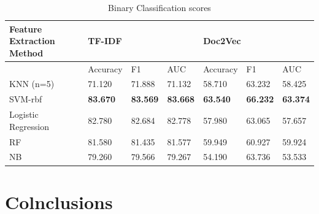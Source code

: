 \documentclass{article}
\begin{document}
\begin{table}[h]
  \begin{tabular}{lllllll}
  \hline
  Feature Extraction Method & \multicolumn{3}{l}{TF-IDF}                          & \multicolumn{3}{l}{Doc2Vec}                         \\ \hline
                            & Accuracy        & F1              & AUC             & Accuracy        & F1              & AUC             \\ \hline
  KNN (n=5)                 & 71.120          & 71.888          & 71.132          & 58.710          & 63.232          & 58.425          \\
  SVM-rbf                   & \textbf{83.670} & \textbf{83.569} & \textbf{83.668} & \textbf{63.540} & \textbf{66.232} & \textbf{63.374} \\
  Logistic Regression       & 82.780          & 82.684          & 82.778          & 57.980          & 63.065          & 57.657          \\
  RF                        & 81.580          & 81.435          & 81.577          & 59.949          & 60.927          & 59.924          \\
  NB                        & 79.260          & 79.566          & 79.267          & 54.190          & 63.736          & 53.533          \\ \hline
  \end{tabular}
  \caption{Binary Classification scores}
\end{table}
  
\section{Colnclusions}




\end{document}
